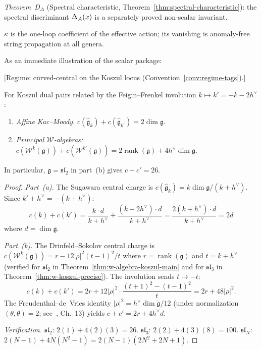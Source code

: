 \begin{itemize}
  \emph{Theorem~D$_\Delta$} (Spectral characteristic,
  Theorem~\ref{thm:spectral-characteristic}):
  the spectral discriminant $\Delta_{\mathcal{A}}(x)$ is a separately proved
  non-scalar invariant.

  $\kappa$ is the one-loop coefficient of the effective action;
  its vanishing is anomaly-free string propagation at all genera.
\end{itemize}


As an immediate illustration of the scalar package:

\begin{theorem}\label{thm:central-charge-complementarity}
\textup{[Regime: curved-central on the Koszul locus
\textup{(}Convention~\textup{\ref{conv:regime-tags})}.]}

For Koszul dual pairs related by the Feigin--Frenkel involution
$k \mapsto k' = -k - 2h^\vee$:
\begin{enumerate}
\item[\textup{(a)}] \emph{Affine Kac--Moody.}
  $c(\widehat{\mathfrak{g}}_k) + c(\widehat{\mathfrak{g}}_{k'})
  = 2 \dim \mathfrak{g}$.
\item[\textup{(b)}] \emph{Principal $\mathcal{W}$-algebras:}
  $c(\mathcal{W}^k(\mathfrak{g})) + c(\mathcal{W}^{k'}(\mathfrak{g}))
   = 2\operatorname{rank}(\mathfrak{g}) + 4h^\vee \dim \mathfrak{g}$.
\end{enumerate}
In particular, $\mathfrak{g} = \mathfrak{sl}_2$ in
part~\textup{(b)} gives $c + c' = 26$.
\end{theorem}

\begin{proof}
\emph{Part~(a).}  The Sugawara central charge is
$c(\widehat{\mathfrak{g}}_k) = k \dim\mathfrak{g}/(k + h^\vee)$.
Since $k' + h^\vee = -(k + h^\vee)$:
\[
c(k) + c(k') = \frac{k \cdot d}{k+h^\vee}
+ \frac{(k+2h^\vee) \cdot d}{k+h^\vee}
= \frac{2(k + h^\vee) \cdot d}{k+h^\vee} = 2d
\]
where $d = \dim\mathfrak{g}$.

\emph{Part~(b).}  The Drinfeld--Sokolov central charge is
$c(\mathcal{W}^k(\mathfrak{g})) = r - 12|\rho|^2 (t-1)^2/t$
where $r = \operatorname{rank}(\mathfrak{g})$ and
$t = k + h^\vee$
(verified for $\mathfrak{sl}_2$ in
Theorem~\ref{thm:w-algebra-koszul-main} and for $\mathfrak{sl}_3$
in Theorem~\ref{thm:w-koszul-precise}).
The involution sends $t \mapsto -t$:
\[
c(k) + c(k') = 2r + 12|\rho|^2 \cdot
\frac{(t+1)^2 - (t-1)^2}{t}
= 2r + 48|\rho|^2.
\]
The Freudenthal--de~Vries identity
$|\rho|^2 = h^\vee \dim\mathfrak{g}/12$
(under normalization $(\theta, \theta) = 2$;
see~\cite{Kac}, Ch.~13)
yields $c + c' = 2r + 4h^\vee d$.

\emph{Verification.}
$\mathfrak{sl}_2$: $2(1) + 4(2)(3) = 26$.
$\mathfrak{sl}_3$: $2(2) + 4(3)(8) = 100$.
$\mathfrak{sl}_N$:
$2(N{-}1) + 4N(N^2{-}1) = 2(N{-}1)(2N^2{+}2N{+}1)$.
\end{proof}

